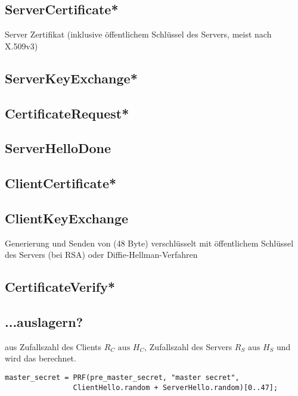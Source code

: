 \subsection*{ServerCertificate*}

Server Zertifikat (inklusive öffentlichem Schlüssel des Servers, meist nach X.509v3)

\subsection*{ServerKeyExchange*}

\subsection*{CertificateRequest*}

\subsection*{ServerHelloDone}

\subsection*{ClientCertificate*}

\subsection*{ClientKeyExchange}

Generierung und Senden von \premastersecret{} (48 Byte) verschlüsselt mit öffentlichem Schlüssel des Servers (bei RSA) oder Diffie-Hellman-Verfahren

\subsection*{CertificateVerify*}


\subsection*{...auslagern? }

aus Zufallszahl des Clients \(R_C \text{ aus } H_C\), Zufallszahl des Servers \(R_S \text{ aus } H_S\) und \premastersecret{} wird das \mastersecret{} berechnet.
\begin{lstlisting}
master_secret = PRF(pre_master_secret, "master secret",
				ClientHello.random + ServerHello.random)[0..47];
\end{lstlisting}

